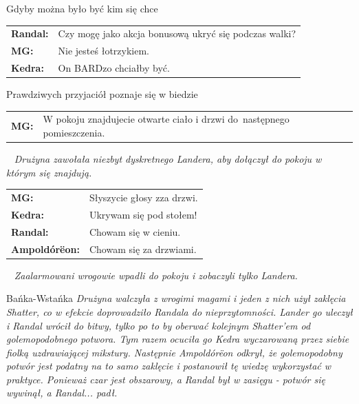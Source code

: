 \documentclass[10pt,twoside,twocolumn]{book}
\begin{document}
\begin{rpg-quotebox}{Gdyby można było być kim się chce}
   \begin{tabularx}{\columnwidth}{lX}
      \textbf{Randal:} & Czy mogę jako akcja bonusową ukryć się podczas walki?\\
      \textbf{MG:} & Nie jesteś łotrzykiem.\\
      \textbf{Kedra:} & On BARDzo chciałby być.\\
   \end{tabularx}
\end{rpg-quotebox}


\begin{rpg-quotebox}{Prawdziwych przyjaciół poznaje się w biedzie}
   \begin{tabularx}{\columnwidth}{lX}
      \textbf{MG:} & W pokoju znajdujecie otwarte ciało i drzwi do~następnego pomieszczenia.\\
   \end{tabularx}
   ~\newline
   \textit{Drużyna zawołała niezbyt dyskretnego Landera, aby dołączył do pokoju w którym się znajdują.}\\

   \begin{tabularx}{\columnwidth}{lX}
      \textbf{MG:} & Słyszycie głosy zza drzwi.\\
      \textbf{Kedra:} & Ukrywam się pod stołem!\\
      \textbf{Randal:} & Chowam się w cieniu.\\
      \textbf{Ampoldórëon:} & Chowam się za drzwiami.\\
   \end{tabularx}
   ~\newline
   \textit{Zaalarmowani wrogowie wpadli do pokoju i zobaczyli tylko Landera.}\\
\end{rpg-quotebox}


\begin{rpg-quotebox}{Bańka-Wstańka}
   \textit{Drużyna walczyła z wrogimi magami i jeden z nich użył zaklęcia Shatter, co w efekcie doprowadziło Randala do nieprzytomności. Lander go uleczył i Randal wrócił do bitwy, tylko po to by oberwać kolejnym Shatter'em od golemopodobnego potwora. Tym razem ocuciła go Kedra wyczarowaną przez siebie fiolką uzdrawiającej mikstury. Następnie Ampoldórëon odkrył, że golemopodobny potwór jest podatny na to samo zaklęcie i postanowił tę wiedzę wykorzystać w praktyce. Ponieważ czar jest obszarowy, a Randal był w zasięgu - potwór się wywinął, a Randal... padł.}\\
\end{rpg-quotebox}
\end{document}
